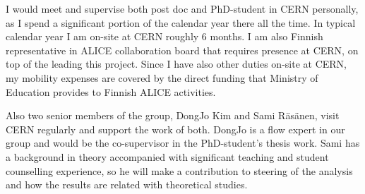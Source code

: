 I would meet and supervise both post doc and PhD-student in CERN personally, as I spend a significant portion of the calendar year there all the time. In typical calendar year I am on-site at CERN roughly 6 months. I am also Finnish representative in ALICE collaboration board that requires presence at CERN, on top of the leading this project. Since I have also other duties on-site at CERN, my mobility expenses are covered by the direct funding that Ministry of Education provides to Finnish ALICE activities.

Also two senior members of the group, DongJo Kim and Sami R\"as\"anen, visit CERN regularly and support the work of both. DongJo is a flow expert in our group and would be the co-supervisor in the PhD-student's thesis work. Sami has a background in theory accompanied with significant teaching and student counselling experience, so he will make a contribution to steering of the analysis and how the results are related with theoretical studies.


\nopagebreak
